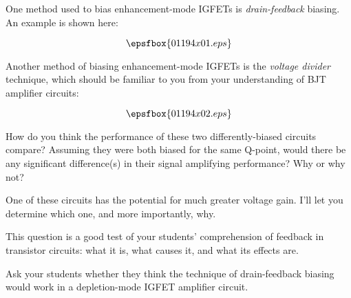 

One method used to bias enhancement-mode IGFETs is {\it drain-feedback} biasing.  An example is shown here:

$$\epsfbox{01194x01.eps}$$

Another method of biasing enhancement-mode IGFETs is the {\it voltage divider} technique, which should be familiar to you from your understanding of BJT amplifier circuits:

$$\epsfbox{01194x02.eps}$$

How do you think the performance of these two differently-biased circuits compare?  Assuming they were both biased for the same Q-point, would there be any significant difference(s) in their signal amplifying performance?  Why or why not?







One of these circuits has the potential for much greater voltage gain.  I'll let you determine which one, and more importantly, why.







This question is a good test of your students' comprehension of feedback in transistor circuits: what it is, what causes it, and what its effects are.

Ask your students whether they think the technique of drain-feedback biasing would work in a depletion-mode IGFET amplifier circuit.



